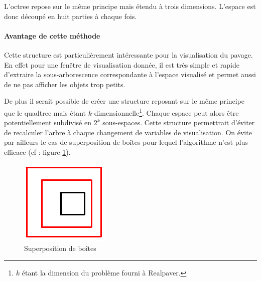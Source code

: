 L'octree repose sur le même principe mais étendu à trois dimensions. L'espace est donc découpé en huit parties à chaque fois.

\paragraph{Avantage de cette méthode}Cette structure est particulièrement intéressante pour la visualisation du pavage. En effet pour une fenêtre de visualisation donnée, il est très simple et rapide d'extraire la sous-arborescence correspondante à l'espace visualisé et permet aussi de ne pas afficher les objets trop petits. 

De plus il serait possible de créer une structure reposant sur le même principe que le quadtree mais étant $k$-dimensionnelle\footnote{$k$ étant la dimension du problème fourni à Realpaver.}. Chaque espace peut alors être potentiellement subdivisé en $2^k$ sous-espaces. Cette structure permettrait d'éviter de recalculer l'arbre à chaque changement de variables de visualisation. On évite par ailleurs le cas de superposition de boîtes pour lequel l'algorithme n'est plus efficace (cf : figure \ref{fig:superpos}).
\begin{figure}[htbp]
\centering
\includegraphics[scale=0.30]{img/QT8}
\caption{Superposition de boîtes}
\label{fig:superpos}
\end{figure}

